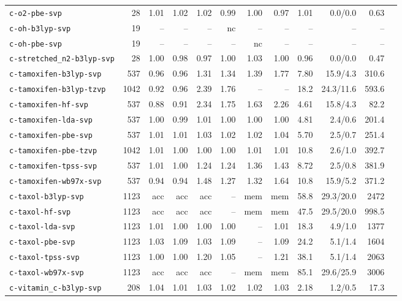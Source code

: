 \begin{longtable}{lrrrrrrrrrrr}
\texttt{c-o2-pbe-svp} & 28 & 1.01 & 1.02 & 1.02 & 0.99 & 1.00 & 0.97 & 1.01 & 0.0/0.0 & 0.63 \\
\texttt{c-oh-b3lyp-svp} & 19 & -- & -- & -- & nc & -- & -- & -- & -- & -- \\
\texttt{c-oh-pbe-svp} & 19 & -- & -- & -- & -- & nc & -- & -- & -- & -- \\
\texttt{c-stretched\_n2-b3lyp-svp} & 28 & 1.00 & 0.98 & 0.97 & 1.00 & 1.03 & 1.00 & 0.96 & 0.0/0.0 & 0.47 \\
\texttt{c-tamoxifen-b3lyp-svp} & 537 & 0.96 & 0.96 & 1.31 & 1.34 & 1.39 & 1.77 & 7.80 & 15.9/4.3 & 310.6 \\
\texttt{c-tamoxifen-b3lyp-tzvp} & 1042 & 0.92 & 0.96 & 2.39 & 1.76 & -- & -- & 18.2 & 24.3/11.6 & 593.6 \\
\texttt{c-tamoxifen-hf-svp} & 537 & 0.88 & 0.91 & 2.34 & 1.75 & 1.63 & 2.26 & 4.61 & 15.8/4.3 & 82.2 \\
\texttt{c-tamoxifen-lda-svp} & 537 & 1.00 & 0.99 & 1.01 & 1.00 & 1.00 & 1.00 & 4.81 & 2.4/0.6 & 201.4 \\
\texttt{c-tamoxifen-pbe-svp} & 537 & 1.01 & 1.01 & 1.03 & 1.02 & 1.02 & 1.04 & 5.70 & 2.5/0.7 & 251.4 \\
\texttt{c-tamoxifen-pbe-tzvp} & 1042 & 1.01 & 1.00 & 1.00 & 1.00 & 1.01 & 1.01 & 10.8 & 2.6/1.0 & 392.7 \\
\texttt{c-tamoxifen-tpss-svp} & 537 & 1.01 & 1.00 & 1.24 & 1.24 & 1.36 & 1.43 & 8.72 & 2.5/0.8 & 381.9 \\
\texttt{c-tamoxifen-wb97x-svp} & 537 & 0.94 & 0.94 & 1.48 & 1.27 & 1.32 & 1.64 & 10.8 & 15.9/5.2 & 371.2 \\
\texttt{c-taxol-b3lyp-svp} & 1123 & acc & acc & acc & -- & mem & mem & 58.8 & 29.3/20.0 & 2472 \\
\texttt{c-taxol-hf-svp} & 1123 & acc & acc & acc & -- & mem & mem & 47.5 & 29.5/20.0 & 998.5 \\
\texttt{c-taxol-lda-svp} & 1123 & 1.01 & 1.00 & 1.00 & 1.00 & -- & 1.01 & 18.3 & 4.9/1.0 & 1377 \\
\texttt{c-taxol-pbe-svp} & 1123 & 1.03 & 1.09 & 1.03 & 1.09 & -- & 1.09 & 24.2 & 5.1/1.4 & 1604 \\
\texttt{c-taxol-tpss-svp} & 1123 & 1.00 & 1.00 & 1.20 & 1.05 & -- & 1.21 & 38.1 & 5.1/1.4 & 2063 \\
\texttt{c-taxol-wb97x-svp} & 1123 & acc & acc & acc & -- & mem & mem & 85.1 & 29.6/25.9 & 3006 \\
\texttt{c-vitamin\_c-b3lyp-svp} & 208 & 1.04 & 1.01 & 1.03 & 1.02 & 1.02 & 1.03 & 2.18 & 1.2/0.5 & 17.3 \\

\end{longtable}
